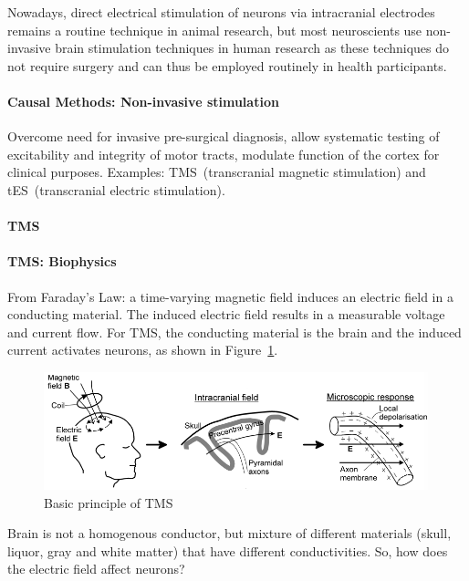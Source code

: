 \documentclass[12pt,article,oneside,a4paper]{memoir}
\begin{document}
Nowadays, direct electrical stimulation of neurons via intracranial electrodes
remains a routine technique in animal research, but most neuroscients use
non-invasive brain stimulation techniques in human research as these techniques
do not require surgery and can thus be employed routinely in health
participants.

\paragraph{Causal Methods: Non-invasive stimulation}
Overcome need for invasive pre-surgical diagnosis, allow systematic testing of
excitability and integrity of motor tracts, modulate function of the cortex for
clinical purposes. Examples: TMS~(transcranial magnetic stimulation) and
tES~(transcranial electric stimulation).

\paragraph{TMS}

\paragraph{TMS: Biophysics}
From Faraday's Law: a time-varying magnetic field induces an electric field in
a conducting material. The induced electric field results in a measurable
voltage and current flow. For TMS, the conducting material is the brain and the
induced current activates neurons, as shown in Figure~\ref{fig:tms}.

\begin{figure}
  \centering
  \includegraphics[width=\textwidth]{imgs/tms.png}
  \caption{Basic principle of TMS}
  \label{fig:tms}
\end{figure}

Brain is not a homogenous conductor, but mixture of different materials (skull,
liquor, gray and white matter) that have different conductivities. So, how does
the electric field affect neurons?
\end{document}
